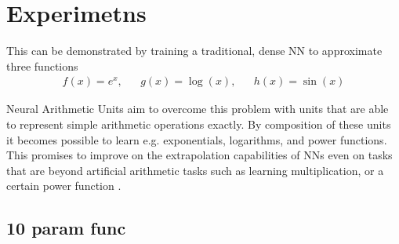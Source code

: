 \documentclass[9pt]{article}
\begin{document}
\section{Experimetns}%
\label{sec:experimetns}
This can be demonstrated by training a traditional, dense NN to approximate
three functions
\begin{align}
  \label{eq:approx_tasks}
  f(x) = e^x, && g(x) = \log(x), && h(x) = \sin(x)
\end{align}

Neural Arithmetic Units aim to overcome this problem with units that are able
to represent simple arithmetic operations exactly. By composition of these
units it becomes possible to learn e.g. exponentials, logarithms, and power
functions. This promises to improve on the extrapolation capabilities of NNs
even on tasks that are beyond artificial arithmetic tasks such as learning
multiplication, or a certain power function .


\subsection{10 param func}%
\label{sub:10_param_func}


% 
% 
\end{document}

